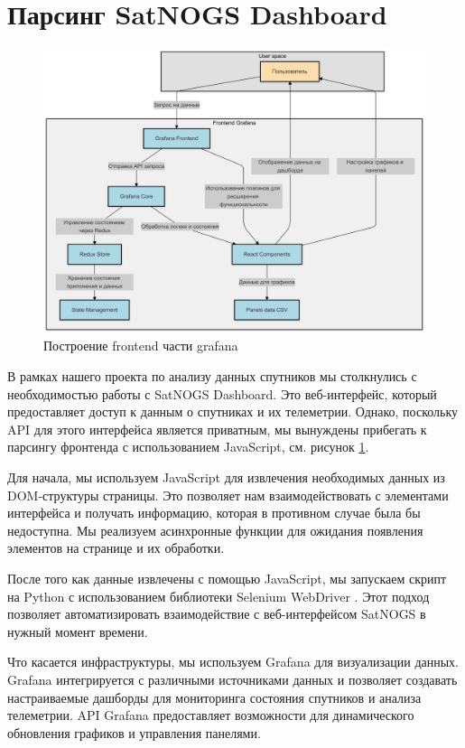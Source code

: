 \documentclass[14pt, a4paper]{bsu}
\begin{document}
\section{Парсинг SatNOGS Dashboard} \begin{figure}[htbp] \centering
	\includegraphics[width=1.0\textwidth]{grafana_frontend_structure}
	\caption{Построение frontend части grafana \cite{react_managing_state}}
	\label{fig:grafana_frontend_structure} \end{figure}

В рамках нашего проекта по анализу данных спутников мы столкнулись с
необходимостью работы с SatNOGS Dashboard. Это веб-интерфейс, который
предоставляет доступ к данным о спутниках и их телеметрии. Однако,
поскольку API для этого интерфейса является приватным, мы вынуждены
прибегать к парсингу фронтенда с использованием JavaScript, см. рисунок
\ref{fig:grafana_frontend_structure}.

Для начала, мы используем JavaScript для извлечения необходимых данных из
DOM-структуры страницы. Это позволяет нам взаимодействовать с элементами
интерфейса и получать информацию, которая в противном случае была бы
недоступна. Мы реализуем асинхронные функции для ожидания появления
элементов на странице и их обработки.

После того как данные извлечены с помощью JavaScript, мы запускаем скрипт
на Python с использованием библиотеки Selenium WebDriver
\cite{selenium_docs}. Этот подход позволяет автоматизировать взаимодействие
с веб-интерфейсом SatNOGS в нужный момент времени.

Что касается инфраструктуры, мы используем Grafana для визуализации данных.
Grafana интегрируется с различными источниками данных и позволяет создавать
настраиваемые дашборды для мониторинга состояния спутников и анализа
телеметрии. API Grafana предоставляет возможности для динамического
обновления графиков и управления панелями.
\end{document}
